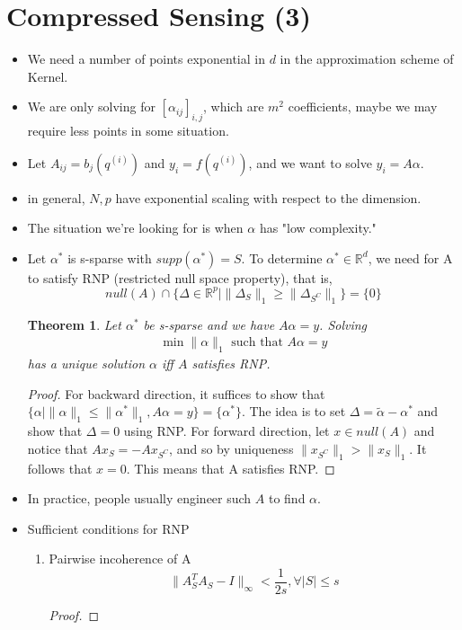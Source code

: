 \documentclass[11pt,reqno]{amsart}
\newtheorem{theorem}{Theorem}
\theoremstyle{remark}
\begin{document}
\begin{sloppypar}
\section{Compressed Sensing (3)}
\begin{itemize}
\item We need a number of points exponential in $d$ in the approximation scheme of Kernel.
\item We are only solving for $[\alpha_{ij}]_{i,j}$, which are $m^2$ coefficients, maybe we may require less points in some situation.
\item Let $A_{ij}=b_j(q^{(i)})$ and $y_i=f(q^{(i)})$, and we want to solve $y_i=A\alpha$.
\item in general, $N,p$ have exponential scaling with respect to the dimension.
\item The situation we're looking for is when $\alpha$ has "low complexity."
\item Let $\alpha^*$ is s-sparse with $supp(\alpha^*)=S$. 
To determine $\alpha^*\in\mathbb{R}^d$, we need for A to satisfy RNP (restricted null space property), that is, 
\[
null(A)\cap\{\Delta\in\mathbb{R}^p|\lVert\Delta_S\rVert_1\geq\lVert\Delta_{S^C}\rVert_1\}=\{0\}
\]
\begin{theorem}
Let $\alpha^*$ be s-sparse and we have $A\alpha=y$.
Solving 
\begin{align*}
\min \lVert \alpha\rVert_1 \text{ such that } A\alpha=y
\end{align*} has a unique solution $\alpha$ iff $A$ satisfies RNP.
\end{theorem}
\begin{proof}
For backward direction, it suffices to show that $\{\alpha|\lVert\alpha\rVert_1\leq \lVert\alpha^*\rVert_1, A\alpha=y\}
=\{\alpha^*\}$. The idea is to set $\Delta=\tilde\alpha - \alpha^*$ and show that $\Delta=0$ using RNP.
For forward direction, let $x\in null(A)$ and notice that $Ax_S=-Ax_{S^C}$, and so by uniqueness 
$\lVert x_{S^C}\rVert_1>\lVert x_S\rVert_1$. It follows that $x=0$. This means that A satisfies RNP.
\end{proof}
\item In practice, people usually engineer such $A$ to find $\alpha$.
\item Sufficient conditions for RNP
\begin{enumerate}
\item Pairwise incoherence of A
\[
\lVert A_S^T A_S-I\rVert_{\infty}< \frac 1{2s}, \forall\lvert S\rvert\leq s
\]
\begin{proof}

\end{proof}
\end{enumerate}
\end{itemize}
\end{sloppypar}
\end{document}
